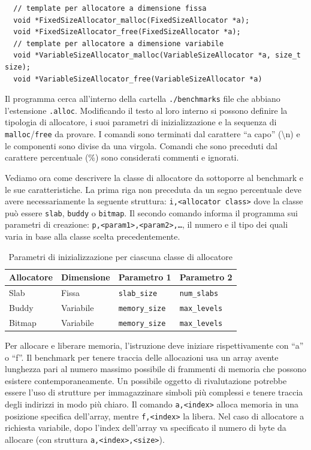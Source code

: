 \begin{lstlisting}
  // template per allocatore a dimensione fissa
  void *FixedSizeAllocator_malloc(FixedSizeAllocator *a);
  void *FixedSizeAllocator_free(FixedSizeAllocator *a);
  // template per allocatore a dimensione variabile
  void *VariableSizeAllocator_malloc(VariableSizeAllocator *a, size_t size);
  void *VariableSizeAllocator_free(VariableSizeAllocator *a)
\end{lstlisting}

Il programma cerca all’interno della cartella \texttt{./benchmarks} file che abbiano l’estensione \texttt{.alloc}. Modificando il testo al loro interno si possono definire la tipologia di allocatore, i suoi parametri di inizializzazione e la sequenza di \texttt{malloc}/\texttt{free} da provare. I comandi sono terminati dal carattere ``a capo'' (\textbackslash n) e le componenti sono divise da una virgola. Comandi che sono preceduti dal carattere percentuale (\%) sono considerati commenti e ignorati.

Vediamo ora come descrivere la classe di allocatore da sottoporre al benchmark e le sue caratteristiche. La prima riga non preceduta da un segno percentuale deve avere necessariamente la seguente struttura: \texttt{i,<allocator class>} dove la classe può essere \texttt{slab}, \texttt{buddy} o \texttt{bitmap}. Il secondo comando informa il programma sui parametri di creazione: \texttt{p,<param1>,<param2>,\ldots}, il numero e il tipo dei quali varia in base alla classe scelta precedentemente.

\begin{table}[H]
\centering
\begin{tabularx}{\textwidth}{|X|X|X|X|}
\hline
\textbf{Allocatore} & \textbf{Dimensione} & \textbf{Parametro 1} & \textbf{Parametro 2} \\
\hline
Slab    & Fissa     & \texttt{slab\_size}   & \texttt{num\_slabs}   \\
\hline
Buddy   & Variabile & \texttt{memory\_size} & \texttt{max\_levels}  \\
\hline
Bitmap  & Variabile & \texttt{memory\_size} & \texttt{max\_levels}  \\
\hline
\end{tabularx}
\caption{Parametri di inizializzazione per ciascuna classe di allocatore}
\end{table}

Per allocare e liberare memoria, l’istruzione deve iniziare rispettivamente con ``a'' o ``f''. Il benchmark per tenere traccia delle allocazioni usa un array avente lunghezza pari al numero massimo possibile di frammenti di memoria che possono esistere contemporaneamente. Un possibile oggetto di rivalutazione potrebbe essere l'uso di strutture per immagazzinare simboli più complessi e tenere traccia degli indirizzi in modo più chiaro. Il comando \texttt{a,<index>} alloca memoria in una posizione specifica dell'array, mentre \texttt{f,<index>} la libera. Nel caso di allocatore a richiesta variabile, dopo l’index dell’array va specificato il numero di byte da allocare (con struttura \texttt{a,<index>,<size>}). 

